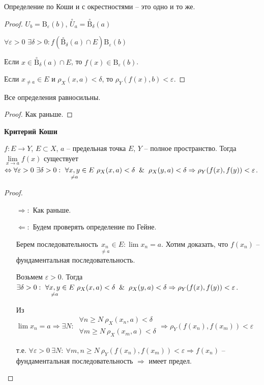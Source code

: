 \begin{remark}
    Определение по Коши и с окрестностями – это одно и то же.
\end{remark}

\begin{proof}
    $U_b=\text{B}_\varepsilon(b)$, $\overset{\circ}{U}_a=\overset{\circ}{\text{B}}_\delta (a)$
    
    $\forall \varepsilon > 0$ $\exists \delta>0: f(\overset{\circ}{\text{B}}_\delta (a) \cap E)\text{B}_\varepsilon (b)$

    Если $x\in \overset{\circ}{\text{B}}_\delta (a)\cap E$, то $f(x)\in \text{B}_\varepsilon(b)$.

    Если $x_{\neq a}\in E$ и $\rho_X(x, a)< \delta$, то $\rho_Y(f(x), b)<\varepsilon$.
\end{proof}

\begin{theorem}
    Все определения равносильны.
\end{theorem}

\begin{proof}
    Как раньше.
\end{proof}

\begin{theorem}
    \textbf{Критерий Коши}

    $f:E\rightarrow Y$, $E\subset X$, $a$ – предельная точка $E$, $Y$ – полное пространство. Тогда $\lim\limits_{x\rightarrow a} f(x)$ существует $\Leftrightarrow\forall \varepsilon>0\ \exists \delta >0:\ \forall \underset{\neq a}{x, y}\in E\ \rho_X(x, a)<\delta\And \rho_X(y, a)<\delta\Rightarrow \rho_Y(f(x), f(y))<\varepsilon$.
\end{theorem}

\begin{proof}
    \begin{enumerate}
        \item[$\Rightarrow:$] Как раньше.
        \item[$\Leftarrow:$]Будем проверять определение по Гейне.

        Берем последовательность $\underset{\neq a}{x_n}\in E:\lim x_n=a$. Хотим доказать, что $f(x_n)$ – фундаментальная последовательность.
    
        Возьмем $\varepsilon>0$. Тогда $\exists \delta >0:\ \forall \underset{\neq a}{x, y}\in E\ \rho_X(x, a)<\delta \And \rho_X(y, a)<\delta\Rightarrow \rho_Y(f(x), f(y))<\varepsilon$.
    
        Из $\lim x_n=a\Rightarrow \exists N:\ \begin{matrix}
            \forall n\geq N\ \rho_X(x_n, a)<\delta \\
            \forall m\geq N\ \rho_X(x_m, a)<\delta
        \end{matrix}\Rightarrow \rho_Y(f(x_n), f(x_m))<\varepsilon$
    
        т.е. $\forall \varepsilon>0\ \exists N:\ \forall m, n\geq N\ \rho_Y(f(x_n), f(x_m))<\varepsilon\Rightarrow f(x_n)$ – фундаментальная последовательность $\Rightarrow$ имеет предел.
    \end{enumerate}
\end{proof}

